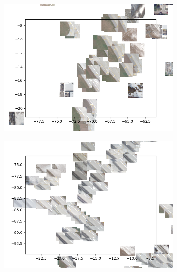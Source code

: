 \begin{figure}[H]
    \centering
    \begin{subfigure}{.5\textwidth}
        \centering
        \includegraphics[width=\textwidth]
        {images/figures/experiments_latent/convolutional_dim50_images_sideways_street.png}
    \end{subfigure}%
    \begin{subfigure}{.5\textwidth}
        \centering
        \includegraphics[width=\textwidth]
        {images/figures/experiments_latent/convolutional_dim50_images_sideways_street3.png}
    \end{subfigure}
    \begin{subfigure}{.5\textwidth}
        \centering

\end{subfigure}
\end{figure}
